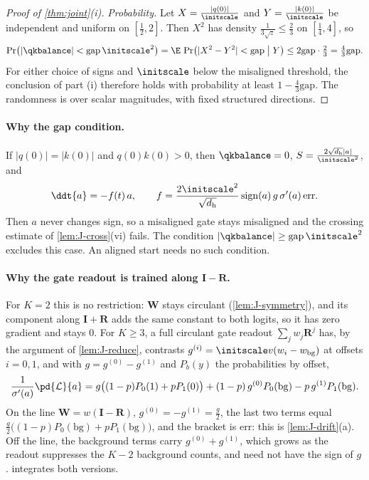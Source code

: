 \begin{proof}[Proof of \cref{thm:joint}(i)]
\emph{Probability.} Let $X=\frac{|q(0)|}{\initscale}$ and $Y=\frac{|k(0)|}{\initscale}$ be independent and uniform on $[\frac{1}{2},2]$. Then $X^2$ has density
$\frac{1}{3\sqrt z}\le\frac{2}{3}$ on $[\frac{1}{4},4]$, so
\[
 \Pr\bigl(|\qkbalance|<\mathrm{gap}\,\initscale^2\bigr)=\E\,\Pr\bigl(|X^2-Y^2|<\mathrm{gap}\bigm|Y\bigr)\le2\mathrm{gap}\cdot\tfrac{2}{3}=\tfrac{4}{3}\mathrm{gap} .
\]
For either choice of signs and $\initscale$ below the misaligned threshold, the conclusion of part (i) therefore holds with
probability at least $1-\tfrac{4}{3}\mathrm{gap}$. The randomness is over scalar magnitudes, with fixed structured directions.\qedhere
\end{proof}

\paragraph{Why the gap condition.}\label{rem:J-balance} If $|q(0)|=|k(0)|$ and $q(0)k(0)>0$, then $\qkbalance=0$, $S=\frac{2\sqrt{d_{\mathrm h}}|a|}{\initscale^2}$, and
\[
 \ddt{a}=-f(t)\,a,\qquad f=\frac{2\initscale^2}{\sqrt{d_{\mathrm h}}}\operatorname{sign}(a)\,g\,\sigma'(a)\,\mathrm{err} .
\]
Then $a$ never changes sign, so a misaligned gate stays misaligned and the crossing estimate of \cref{lem:J-cross}(vi) fails. The condition
$|\qkbalance|\ge\mathrm{gap}\,\initscale^2$ excludes this case. An aligned start needs no such condition.

\paragraph{Why the gate readout is trained along $\mathbf I-\mathbf R$.}\label{rem:J-line} For $K=2$ this is no restriction: $\mathbf W$ stays circulant
(\cref{lem:J-symmetry}), and its component along $\mathbf I+\mathbf R$ adds the same constant to both logits, so it has zero gradient and stays $0$.
For $K\ge3$, a full circulant gate readout $\sum_jw_j\mathbf R^j$ has, by the argument of \cref{lem:J-reduce}, contrasts $g^{(i)}=\initscale v(w_i-w_{\mathrm{bg}})$
at offsets $i=0,1$, and with $g=g^{(0)}-g^{(1)}$ and $P_b(y)$ the probabilities by offset,
\[
 \frac{1}{\sigma'(a)}\pd{\mathcal L}{a}=g\bigl((1-p)P_0(1)+pP_1(0)\bigr)+(1-p)\,g^{(0)}P_0(\mathrm{bg})-p\,g^{(1)}P_1(\mathrm{bg}).
\]
On the line $\mathbf W=w(\mathbf I-\mathbf R)$, $g^{(0)}=-g^{(1)}=\frac{g}{2}$, the last two terms equal $\frac{g}{2}\bigl((1-p)P_0(\mathrm{bg})+pP_1(\mathrm{bg})\bigr)$, and the bracket is
$\mathrm{err}$: this is \cref{lem:J-drift}(a). Off the line, the background terms carry $g^{(0)}+g^{(1)}$, which grows as the readout suppresses the $K-2$
background counts, and need not have the sign of $g$.  integrates both versions.


